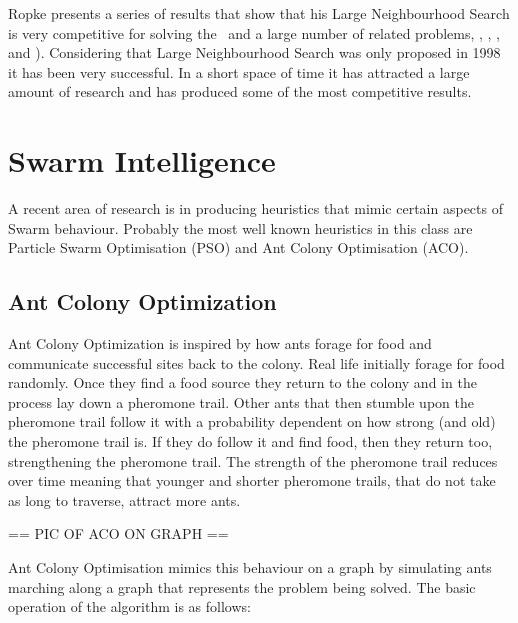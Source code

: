Ropke presents a series of results that show that his Large Neighbourhood Search is very competitive for solving the \VRP\ and a large number of related problems, \CVRP, \VRPTW, \PDPTW, and \DARP). Considering that Large Neighbourhood Search was only proposed in 1998 it has been very successful. In a short space of time it has attracted a large amount of research and has produced some of the most competitive results.

\section{Swarm Intelligence}

A recent area of research is in producing heuristics that mimic certain aspects of Swarm behaviour. Probably the most well known heuristics in this class are Particle Swarm Optimisation (PSO) and Ant Colony Optimisation (ACO). 

\subsection{Ant Colony Optimization}

Ant Colony Optimization is inspired by how ants forage for food and communicate successful sites back to the colony. Real life initially forage for food randomly. Once they find a food source they return to the colony and in the process lay down a pheromone trail. Other ants that then stumble upon the pheromone trail follow it with a probability dependent on how strong (and old) the pheromone trail is. If they do follow it and find food, then they return too, strengthening the pheromone trail. The strength of the pheromone trail reduces over time meaning that younger and shorter pheromone trails, that do not take as long to traverse, attract more ants.  

== PIC OF ACO ON GRAPH ==

Ant Colony Optimisation mimics this behaviour on a graph by simulating ants marching along a graph that represents the problem being solved. The basic operation of the algorithm is as follows: 

\begin{algorithm}
\end{algorithm}
 
